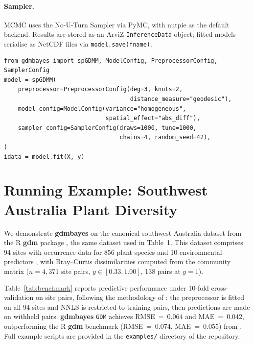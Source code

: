 \documentclass[12pt,a4paper]{article}
\begin{document}
\paragraph{Sampler.}
MCMC uses the No-U-Turn Sampler \citep[NUTS;][]{hoffman2014} via PyMC, with
nutpie as the default backend. Results are stored as an ArviZ
\texttt{InferenceData} object; fitted models serialise as NetCDF files via
\texttt{model.save(fname)}.

\begin{lstlisting}[style=python]
from gdmbayes import spGDMM, ModelConfig, PreprocessorConfig, SamplerConfig
model = spGDMM(
    preprocessor=PreprocessorConfig(deg=3, knots=2,
                                    distance_measure="geodesic"),
    model_config=ModelConfig(variance="homogeneous",
                             spatial_effect="abs_diff"),
    sampler_config=SamplerConfig(draws=1000, tune=1000,
                                 chains=4, random_seed=42),
)
idata = model.fit(X, y)
\end{lstlisting}

\section{Running Example: Southwest Australia Plant Diversity}\label{sec:example}

We demonstrate \textbf{gdmbayes} on the canonical southwest Australia dataset
from the R \textbf{gdm} package \citep{fitzpatrick2021}, the same dataset used
in \citet{white2024} Table~1. This dataset comprises 94 sites with occurrence
data for 856 plant species and 10 environmental predictors
\citep{fitzpatrick2013}, with Bray--Curtis dissimilarities computed from the
community matrix ($n = 4{,}371$ site pairs, $y \in [0.33, 1.00]$, 138 pairs
at $y = 1$).

Table~\ref{tab:benchmark} reports predictive performance under 10-fold
cross-validation on site pairs, following the methodology of
\citet{white2024}: the preprocessor is fitted on all 94 sites and NNLS is
restricted to training pairs, then predictions are made on withheld pairs.
\textbf{gdmbayes} \texttt{GDM} achieves RMSE~=~0.064 and MAE~=~0.042,
outperforming the R \textbf{gdm} benchmark (RMSE~=~0.074, MAE~=~0.055) from
\citet{white2024}. Full example scripts are provided in the
\texttt{examples/} directory of the repository.
\end{document}
